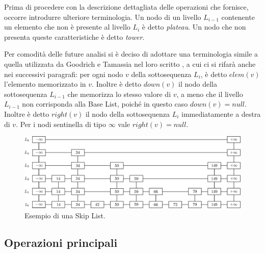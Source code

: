 	Prima di procedere con la descrizione dettagliata delle operazioni che fornisce, occorre introdurre ulteriore terminologia. Un nodo di un livello $ L_{i-1} $ contenente un elemento che non è presente al livello $ L_{i} $ è detto \textit{plateau}. Un nodo che non presenta queste caratteristiche è detto \textit{tower}. \cite{authskiplist}
	
	Per comodità delle future analisi si è deciso di adottare una terminologia simile a quella utilizzata da Goodrich e Tamassia nel loro scritto \cite{authskiplist}, a cui ci si rifarà anche nei successivi paragrafi: per ogni nodo $ v $ della sottosequenza $ L_{i} $, è detto $ elem(v) $ l'elemento memorizzato in $ v $. Inoltre è detto $ down(v) $ il nodo della sottosequenza $ L_{i-1} $ che memorizza lo stesso valore di $ v $, a meno che il livello $ L_{i-1} $ non corrisponda alla Base List, poiché in questo caso $ down(v) = null$.
	Inoltre è detto $ right(v) $ il nodo della sottosequenza $ L_{i} $ immediatamente a destra di $ v $. Per i nodi sentinella di tipo $\infty$ vale $ right(v) = null $.
		
	\begin{figure}
		\centering
		\includegraphics[scale=0.6]{figure/skiplist.eps}
		\caption{Esempio di una Skip List.}\label{fig:skiplist}
	\end{figure}
		
	\subsection{Operazioni principali}
	
%		

